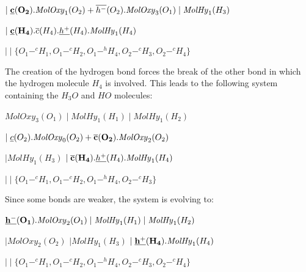 \documentclass[runningheads]{llncs}
\newcommand{\MolOxy}{\mathit{MolOxy}}
\newcommand{\MolHy}{\mathit{MolHy}}
\begin{document}
\begin{center}$\mid {\bf \underline{c}(O_2)}.\MolOxy_1(O_2) +\overline{h^-}(O_2).\MolOxy_3(O_1) \mid \MolHy_1(H_3)$
\end{center}

\begin{center}$ \mid {\bf \underline{c}(H_4)}.\overline{c}(H_4).\underline{h^+}(H_4).\MolHy_{1}(H_4)$
\end{center}

\begin{center}$\mid\mid \{O_1 -^c H_1, O_1 -^c H_2, O_1-^h H_4,O_2 -^c H_3, O_2 -^c H_4\}$
\end{center}

\noindent 
The creation of the hydrogen bond forces the break of the other bond in 
which the hydrogen molecule $H_4$ is involved. This leads to the following
system containing the $H_3O$ and $HO$ molecules:

\begin{center}$\MolOxy_3(O_1) \mid \MolHy_1(H_1) \mid \MolHy_1(H_2) $\end{center}

\begin{center}$\mid \underline{c}(O_2).\MolOxy_0(O_2) +{\bf \overline{c}(O_2)}.\MolOxy_2(O_2)$\end{center}

\begin{center}$ \mid \MolHy_1(H_3)$ $ \mid {\bf \overline{c}(H_4)}.\underline{h^+}(H_4).\MolHy_{1}(H_4)$\end{center}

\begin{center}$\mid\mid \{O_1 -^c H_1, O_1 -^c H_2, O_1-^h H_4,O_2 -^c H_3\}$\end{center}

\noindent 
Since some bonds are weaker, the system is evolving to:

\begin{center}${\bf \underline{h^-}(O_1)}.\MolOxy_2(O_1) \mid \MolHy_1(H_1) \mid \MolHy_1(H_2) $\end{center}

\begin{center}$\mid \MolOxy_2(O_2)$ $ \mid \MolHy_1(H_3)$ $ \mid {\bf \underline{h^+}(H_4)}.\MolHy_{1}(H_4)$\end{center}

\begin{center}$\mid\mid \{O_1 -^c H_1, O_1 -^c H_2, O_1-^h H_4,O_2 -^c H_3, O_2 -^c H_4\}$\end{center}
\end{document}
